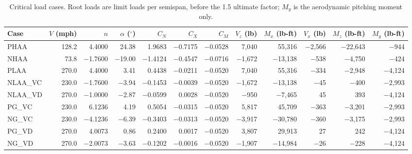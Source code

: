 \documentclass[11pt]{article}
\begin{document}
\begin{table}[H]
\centering
\caption{Critical load cases. Root loads are limit loads per semispan, before the 1.5 ultimate factor; $M_y$ is the aerodynamic pitching moment only.}
\label{tab:loadcases}
\scriptsize
\setlength{\tabcolsep}{3pt}
\begin{tabular}{lrrrrrrrrrrr}
\toprule
Case & $V$ (mph) & $n$ & $\alpha$ ($^\circ$) & $C_N$ & $C_X$ & $C_M$ & $V_z$ (lb) & $M_x$ (lb-ft) & $V_x$ (lb) & $M_z$ (lb-ft) & $M_y$ (lb-ft) \\
\midrule
PHAA & 128.2 & 4.4000 & 24.38 & 1.9683 & $-$0.7175 & $-$0.0528 & 7{,}040 & 55{,}316 & $-$2{,}566 & $-$22{,}643 & $-$944 \\
NHAA & 73.8 & $-$1.7600 & $-$19.00 & $-$1.4124 & $-$0.4547 & $-$0.0716 & $-$1{,}672 & $-$13{,}138 & $-$538 & $-$4{,}750 & $-$424 \\
PLAA & 270.0 & 4.4000 & 3.41 & 0.4438 & $-$0.0211 & $-$0.0520 & 7{,}040 & 55{,}316 & $-$334 & $-$2{,}948 & $-$4{,}124 \\
NLAA\_VC & 230.0 & $-$1.7600 & $-$3.94 & $-$0.1453 & $-$0.0039 & $-$0.0520 & $-$1{,}672 & $-$13{,}138 & $-$45 & $-$400 & $-$2{,}993 \\
NLAA\_VD & 270.0 & $-$1.0000 & $-$2.87 & $-$0.0599 & 0.0028 & $-$0.0520 & $-$950 & $-$7{,}465 & 45 & 393 & $-$4{,}124 \\
PG\_VC & 230.0 & 6.1236 & 4.19 & 0.5054 & $-$0.0315 & $-$0.0520 & 5{,}817 & 45{,}709 & $-$363 & $-$3{,}201 & $-$2{,}993 \\
NG\_VC & 230.0 & $-$4.1236 & $-$6.39 & $-$0.3403 & $-$0.0313 & $-$0.0520 & $-$3{,}917 & $-$30{,}780 & $-$360 & $-$3{,}175 & $-$2{,}993 \\
PG\_VD & 270.0 & 4.0073 & 0.86 & 0.2400 & 0.0017 & $-$0.0520 & 3{,}807 & 29{,}913 & 27 & 242 & $-$4{,}124 \\
NG\_VD & 270.0 & $-$2.0073 & $-$3.63 & $-$0.1202 & $-$0.0016 & $-$0.0520 & $-$1{,}907 & $-$14{,}984 & $-$26 & $-$228 & $-$4{,}124 \\
\bottomrule
\end{tabular}
\end{table}
\end{document}
